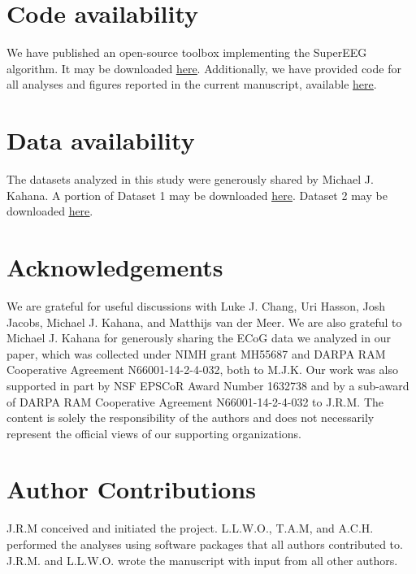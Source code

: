 \documentclass[11pt]{article}
\begin{document}
\section*{Code availability}
We have published an open-source toolbox
implementing the SuperEEG algorithm.  It may be downloaded
\href{https://supereeg.readthedocs.io/en/latest/}{\underline{here}}.
Additionally, we have provided code for all analyses and figures reported in the
current manuscript, available
\href{https://github.com/ContextLab/supereeg_paper}{\underline{here}}.

\section*{Data availability}
The datasets analyzed in this study were generously shared by Michael
J. Kahana.  A portion of Dataset 1 may be downloaded
\href{http://memory.psych.upenn.edu/Request_EEG_access?paper=SedeEtal03}{\underline{here}}.
Dataset 2 may be downloaded
\href{http://memory.psych.upenn.edu/Request_EEG_access?paper=EzzyEtal17}{\underline{here}}.

\section*{Acknowledgements}
We are grateful for useful discussions with Luke J.
Chang, Uri Hasson, Josh Jacobs, Michael J. Kahana, and Matthijs van der Meer.
We are also grateful to Michael J. Kahana for generously sharing the ECoG data
we analyzed in our paper, which was collected under NIMH grant MH55687 and DARPA
RAM Cooperative Agreement N66001-14-2-4-032, both to M.J.K.  Our work was also
supported in part by NSF EPSCoR Award Number 1632738 and by a sub-award of DARPA
RAM Cooperative Agreement N66001-14-2-4-032 to J.R.M.  The content is solely the
responsibility of the authors and does not necessarily represent the official
views of our supporting organizations.

\section*{Author Contributions} J.R.M conceived and initiated the project.
L.L.W.O., T.A.M, and A.C.H. performed the analyses using software packages that
all authors contributed to. J.R.M. and L.L.W.O. wrote the manuscript with input
from all other authors.



\end{document}

